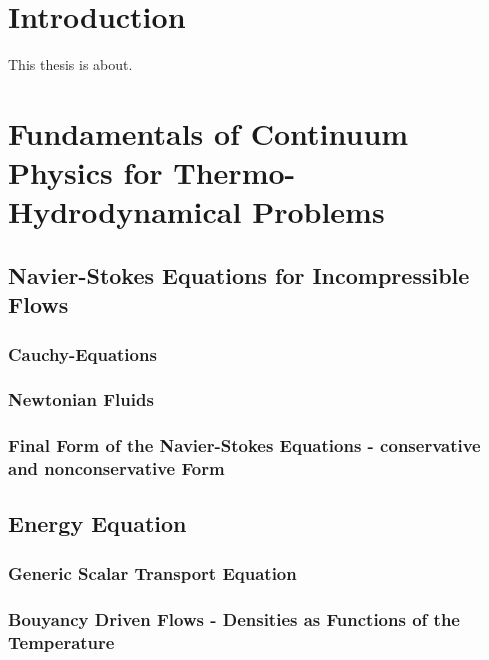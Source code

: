 \documentclass[article,type=msc,colorback,accentcolor=tud2a]{tudthesis}
\begin{document}
  \author{Fabian Nuraddin Alexander Gabel}
  \makethesistitle
  \tableofcontents

\printnomenclature
  \section{Introduction}

  This thesis is about. 

  \section{Fundamentals of Continuum Physics for Thermo-Hydrodynamical Problems}

    \subsection{Navier-Stokes Equations for Incompressible Flows}

      \subsubsection{Cauchy-Equations}
      \subsubsection{Newtonian Fluids}
      \subsubsection{Final Form of the Navier-Stokes Equations - conservative and nonconservative Form}

    \subsection{Energy Equation}

      \subsubsection{Generic Scalar Transport Equation}
      \subsubsection{Bouyancy Driven Flows - Densities as Functions of the Temperature}
\end{document}
